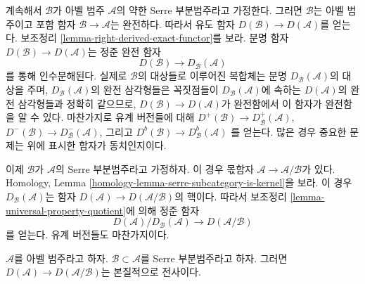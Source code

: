 \noindent
계속해서 $\mathcal{B}$가 아벨 범주 $\mathcal{A}$의 약한 Serre
부분범주라고 가정한다. 그러면 $\mathcal{B}$는 아벨 범주이고 포함 함자
$\mathcal{B} \to \mathcal{A}$는 완전하다. 따라서 유도 함자
$D(\mathcal{B}) \to D(\mathcal{A})$를 얻는다. 보조정리
\ref{lemma-right-derived-exact-functor}를 보라. 분명 함자
$D(\mathcal{B}) \to D(\mathcal{A})$는 정준 완전 함자
\begin{equation}
\label{equation-compare}
D(\mathcal{B}) \longrightarrow D_\mathcal{B}(\mathcal{A})
\end{equation}
를 통해 인수분해된다. 실제로 $\mathcal{B}$의 대상들로 이루어진 복합체는
분명 $D_\mathcal{B}(\mathcal{A})$의 대상을 주며,
$D_\mathcal{B}(\mathcal{A})$의 완전 삼각형들은 꼭짓점들이
$D_\mathcal{B}(\mathcal{A})$에 속하는 $D(\mathcal{A})$의 완전
삼각형들과 정확히 같으므로, $D(\mathcal{B}) \to D(\mathcal{A})$가
완전함에서 이 함자가 완전함을 알 수 있다. 마찬가지로 유계 버전들에 대해
$D^+(\mathcal{B}) \to D^+_\mathcal{B}(\mathcal{A})$,
$D^-(\mathcal{B}) \to D^-_\mathcal{B}(\mathcal{A})$, 그리고
$D^b(\mathcal{B}) \to D^b_\mathcal{B}(\mathcal{A})$
를 얻는다. 많은 경우 중요한 문제는 위에 표시한 함자가 동치인지이다.

\medskip\noindent
이제 $\mathcal{B}$가 $\mathcal{A}$의 Serre 부분범주라고 가정하자.
이 경우 몫함자 $\mathcal{A} \to \mathcal{A}/\mathcal{B}$가 있다.
Homology, Lemma \ref{homology-lemma-serre-subcategory-is-kernel}을 보라.
이 경우 $D_\mathcal{B}(\mathcal{A})$는 함자
$D(\mathcal{A}) \to D(\mathcal{A}/\mathcal{B})$의 핵이다.
따라서 보조정리 \ref{lemma-universal-property-quotient}에 의해 정준 함자
$$
D(\mathcal{A})/D_\mathcal{B}(\mathcal{A})
\longrightarrow
D(\mathcal{A}/\mathcal{B})
$$
를 얻는다. 유계 버전들도 마찬가지이다.

\begin{lemma}
\label{lemma-derived-of-quotient}
$\mathcal{A}$를 아벨 범주라고 하자.
$\mathcal{B} \subset \mathcal{A}$를 Serre 부분범주라고 하자.
그러면 $D(\mathcal{A}) \to D(\mathcal{A}/\mathcal{B})$는
본질적으로 전사이다.
\end{lemma}

